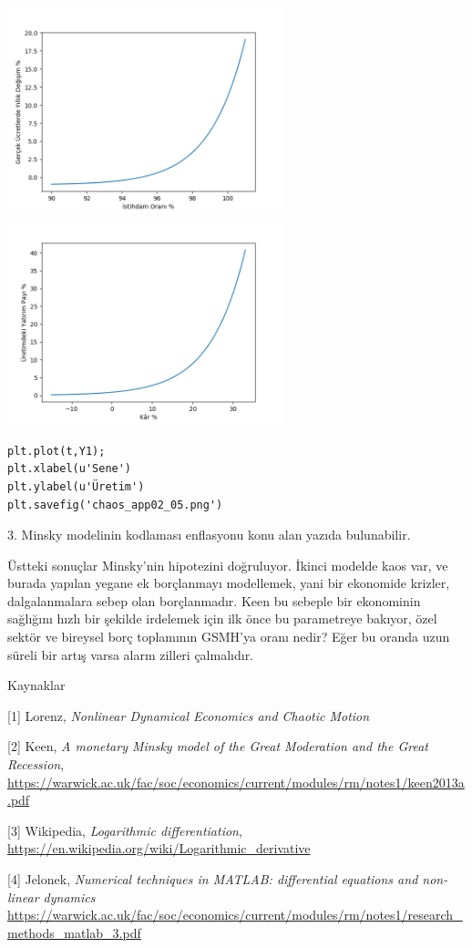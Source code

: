 \documentclass[12pt,fleqn]{article}\usepackage{../../common}
\begin{document}
\includegraphics[height=6cm]{chaos_app02_03.png}
\includegraphics[height=6cm]{chaos_app02_04.png}

\begin{verbatim}
plt.plot(t,Y1);
plt.xlabel(u'Sene')
plt.ylabel(u'Üretim')
plt.savefig('chaos_app02_05.png')
\end{verbatim}

3. Minsky modelinin kodlaması enflasyonu konu alan yazıda bulunabilir.

Üstteki sonuçlar Minsky'nin hipotezini doğruluyor. İkinci modelde kaos var,
ve burada yapılan yegane ek borçlanmayı modellemek, yani bir ekonomide
krizler, dalgalanmalara sebep olan borçlanmadır. Keen bu sebeple bir
ekonominin sağlığını hızlı bir şekilde irdelemek için ilk önce bu
parametreye bakıyor, özel sektör ve bireysel borç toplamının GSMH'ya oranı
nedir? Eğer bu oranda uzun süreli bir artış varsa alarm zilleri
çalmalıdır. 

Kaynaklar

[1] Lorenz, {\em Nonlinear Dynamical Economics and Chaotic Motion}

[2] Keen, {\em A monetary Minsky model of the Great Moderation and the Great Recession}, \url{https://warwick.ac.uk/fac/soc/economics/current/modules/rm/notes1/keen2013a.pdf}

[3] Wikipedia, {\em Logarithmic differentiation}, \url{https://en.wikipedia.org/wiki/Logarithmic_derivative}

[4] Jelonek, {\em Numerical techniques in MATLAB: differential equations and non-linear dynamics} \url{https://warwick.ac.uk/fac/soc/economics/current/modules/rm/notes1/research_methods_matlab_3.pdf}
\end{document}
